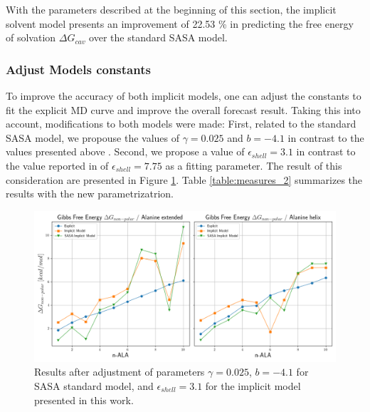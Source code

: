 With the parameters described at the beginning of this section, the implicit solvent model presents an improvement of 22.53 \% in predicting the free energy of solvation $\Delta G_{cav}$ over the standard SASA model. 

\subsubsection{Adjust Models constants}

To improve the accuracy of both implicit models, one can adjust the constants to fit the explicit MD curve and improve the overall forecast result. Taking this into account, modifications to both models were made: First, related to the standard SASA model, we propouse the values of $\gamma = 0.025$ and $b = -4.1$ in contrast to the values presented above \cite{cooper2020simple}. Second, we propose a value of $\epsilon_{shell}=3.1$ in contrast to the value reported in \cite{cooper2020simple} of $\epsilon_{shell}=7.75$ as a fitting parameter. The result of this consideration are presented in Figure \ref{fig:new_cc}. Table \ref{table:measures_2} summarizes the results with the new parametrizatrion. 

\begin{figure}[h]
    \centering
    \includegraphics[scale=0.52]{Figures/Chapter_6/New_CC.png}
    \caption{Results after adjustment of parameters $\gamma = 0.025$, $b = -4.1$ for SASA standard model, and $\epsilon_{shell}=3.1$ for the implicit model presented in this work.}
    \label{fig:new_cc}
\end{figure}

